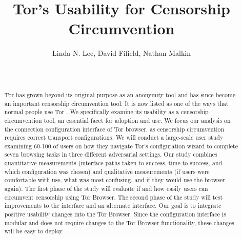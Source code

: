 \documentclass{template}
\begin{document}
\title{Tor's Usability for Censorship Circumvention}
\author{
 \alignauthor Linda N. Lee, David Fifield, Nathan Malkin \\
   \vspace{0.5em}
    \\
   \\
}
\maketitle

\begin{abstract}
Tor has grown beyond its original purpose as an anonymity tool and has 
since become an important censorship circumvention tool. It is now listed
as one of the ways that normal people use Tor \cite{whotor}.
We specifically examine its usability as a censorship circumvention tool,
an essential facet for adoption and use.  
We focus our analysis on the connection configuration interface of Tor browser,
as censorship circumvention requires correct transport configurations.
We will conduct a large-scale user study examining 60-100 of users 
on how they navigate Tor's configuration wizard to complete seven browsing tasks 
in three different adversarial settings. Our study combines quantitative measurements (interface
paths taken to success, time to success, and which configuration was chosen) and
qualitative measurements (if users were comfortable with use, what was most confusing, and 
if they would use the browser again). The first phase of the study will evaluate if and how 
easily users can circumvent censorship using Tor Browser. The second phase
of the study will test improvements to the interface and an alternate interface. 
Our goal is to integrate positive usability changes into the Tor Browser. Since
the configuration interface is modular and does not require changes to the Tor Browser
functionality, these changes will be easy to deploy. 

\end{abstract}

\end{document}
